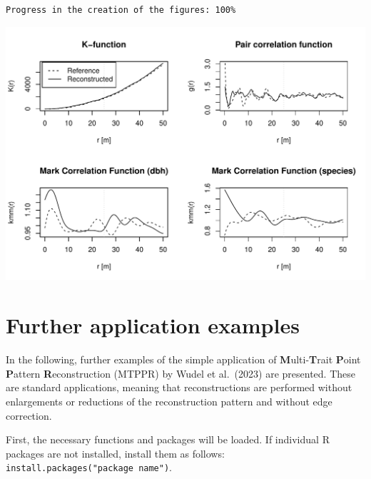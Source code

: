 \documentclass[
  letterpaper,
  DIV=11,
  numbers=noendperiod]{scrreprt}
\begin{document}
\begin{verbatim}
Progress in the creation of the figures: 100% 
\end{verbatim}

\includegraphics{simple_application_example_files/figure-pdf/unnamed-chunk-6-1.pdf}


\chapter{Further application
examples}\label{further-application-examples}

In the following, further examples of the simple application of
\textbf{M}ulti-\textbf{T}rait \textbf{P}oint \textbf{P}attern
\textbf{R}econstruction (MTPPR) by Wudel et al.~(2023) are presented.
These are standard applications, meaning that reconstructions are
performed without enlargements or reductions of the reconstruction
pattern and without edge correction.

First, the necessary functions and packages will be loaded. If
individual R packages are not installed, install them as follows:
\texttt{install.packages("package\ name")}.
\end{document}

